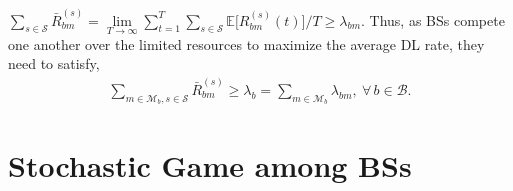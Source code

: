 \documentclass[conference]{IEEEtran}
\begin{document}
%
%
%
$\sum_{s\in\mathcal{S}}\bar{R}^{(s)}_{bm}=\lim\limits_{T\to\infty}\sum_{t=1}^{T}\sum_{s\in\mathcal{S}}\mathbb{E}\big[R^{(s)}_{bm}(t)\big]/T\geq \lambda_{bm}$.
%
%
%
Thus, as BSs compete one another over the limited resources to maximize the average DL rate, they need to satisfy,
\begin{align}
\textstyle \sum\limits_{m\in\mathcal{M}_b,s\in\mathcal{S}}\bar{R}^{(s)}_{bm}\geq \lambda_b= \sum\limits_{m\in\mathcal{M}_b}\lambda_{bm},~\forall\,b\in\mathcal{B}. \label{Eq: BS QoS}
\end{align}


\section{Stochastic Game among BSs}\label{Sec: Stochastic Game}
\end{document}
